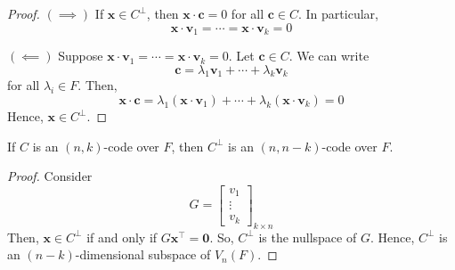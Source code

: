 \begin{proof}
    $ (\implies) $ If $ \bm{x}\in C^{\perp} $, then $ \bm{x}\cdot \bm{c}=0 $ for all
    $ \bm{c}\in C $. In particular,
    \[ \bm{x}\cdot \bm{v}_1=\cdots =\bm{x}\cdot \bm{v}_k=0 \]

    $ (\impliedby) $ Suppose $ \bm{x}\cdot \bm{v}_1=\cdots =\bm{x}\cdot \bm{v}_k=0 $. Let $ \bm{c}\in C $.
    We can write
    \[ \bm{c}=\lambda_1\bm{v}_1+\cdots+\lambda_k\bm{v}_k \]
    for all $ \lambda_i\in F $. Then,
    \[ \bm{x}\cdot \bm{c}=\lambda_1(\bm{x}\cdot \bm{v}_1)+\cdots+\lambda_k(\bm{x}\cdot \bm{v}_k)=0 \]
    Hence, $ \bm{x}\in C^{\perp} $.
\end{proof}

\begin{thmbox}
    \begin{theorem}
        If $ C $ is an $ (n,k) $-code over $ F $, then $ C^{\perp} $ is an
        $ (n,n-k) $-code over $ F $.
    \end{theorem} \end{thmbox}

\begin{proof}
    Consider
    \[ G=\begin{bmatrix}
            v_1    \\
            \vdots \\
            v_k
        \end{bmatrix}_{k\times n} \]
    Then, $ \bm{x}\in C^{\perp} $ if and only if $ G \bm{x}^{\top}=\bm{0} $. So, $ C^{\perp} $
    is the nullspace of $ G $. Hence, $ C^{\perp} $ is an
    $ (n-k) $-dimensional subspace of $ V_n(F) $.
\end{proof}
